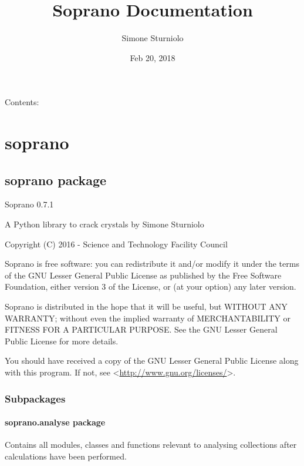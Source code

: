 \documentclass[letterpaper,10pt,english]{sphinxmanual}
\title{Soprano Documentation}
\date{Feb 20, 2018}
\author{Simone Sturniolo}
\begin{document}
\maketitle
\tableofcontents
{}\label{index::doc}


Contents:


\chapter{soprano}
\label{doctree/modules:welcome-to-soprano-s-documentation-release-release}\label{doctree/modules:soprano}\label{doctree/modules::doc}

\section{soprano package}
\label{doctree/soprano:module-soprano}\label{doctree/soprano::doc}\label{doctree/soprano:soprano-package}
Soprano 0.7.1

A Python library to crack crystals
by Simone Sturniolo

Copyright (C) 2016 - Science and Technology Facility Council

Soprano is free software: you can redistribute it and/or modify
it under the terms of the GNU Lesser General Public License as published by
the Free Software Foundation, either version 3 of the License, or
(at your option) any later version.

Soprano is distributed in the hope that it will be useful,
but WITHOUT ANY WARRANTY; without even the implied warranty of
MERCHANTABILITY or FITNESS FOR A PARTICULAR PURPOSE.  See the
GNU Lesser General Public License for more details.

You should have received a copy of the GNU Lesser General Public License
along with this program.  If not, see \textless{}\url{http://www.gnu.org/licenses/}\textgreater{}.


\subsection{Subpackages}
\label{doctree/soprano:subpackages}

\subsubsection{soprano.analyse package}
\label{doctree/soprano.analyse:module-soprano.analyse}\label{doctree/soprano.analyse:soprano-analyse-package}\label{doctree/soprano.analyse::doc}
Contains all modules, classes and functions relevant
to analysing collections after calculations have been performed.
\end{document}
